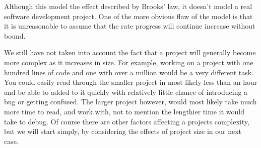 \documentclass{article}
\newenvironment{atomize}
    {\begin{list} {} {
            \setlength\itemindent{0pt}
            \setlength\leftmargin{10pt}
            \setlength\labelwidth{0pt}
    }}
    {\end{list}}
\begin{document}
\begin{atomize}
\begin{atomize}
          Although this model the effect described by Brooks' law, it doesn't
          model a real software development project. One of the more obvious
          flaw of the model is that it is unreasonable to assume that the rate
          progress will continue increase without bound.
                    
          We still have not taken into account the fact that a project will
          generally become more complex as it increases in size. For example,
          working on a project with one hundred lines of code and one with over
          a million would be a very different task. You could easily read
          through the smaller project in most likely less than an hour and be
          able to added to it quickly with relatively little chance of
          introducing a bug or getting confused. The larger project however,
          would most likely take much more time to read, and work with, not to
          mention the lengthier time it would take to debug. Of course there 
          are other factors affecting a projects complexity, but we will start
          simply, by considering the effects of project size in our next case.
      \end{atomize}

  \end{atomize}
\end{document}
